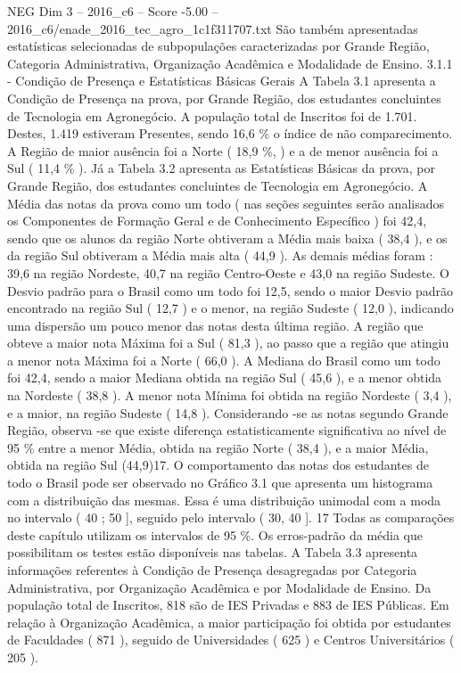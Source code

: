 \begin{textsample}{NEG Dim 3 – 2016\_c6 – Score -5.00 – 2016\_c6/enade\_2016\_tec\_agro\_1c1f311707.txt}
São também apresentadas estatísticas selecionadas de subpopulações caracterizadas por Grande Região, Categoria Administrativa, Organização Acadêmica e Modalidade de Ensino. 3.1.1 - Condição de Presença e Estatísticas Básicas Gerais A Tabela 3.1 apresenta a Condição de Presença na prova, por Grande Região, dos estudantes concluintes de Tecnologia em Agronegócio.
A população total de Inscritos foi de 1.701.
Destes, 1.419 estiveram Presentes, sendo 16,6 \% o índice de não comparecimento.
A Região de maior ausência foi a Norte ( 18,9 \%, ) e a de menor ausência foi a Sul ( 11,4 \% ).
Já a Tabela 3.2 apresenta as Estatísticas Básicas da prova, por Grande Região, dos estudantes concluintes de Tecnologia em Agronegócio.
A Média das notas da prova como um todo ( nas seções seguintes serão analisados os Componentes de Formação Geral e de Conhecimento Específico ) foi 42,4, sendo que os alunos da região Norte obtiveram a Média mais baixa ( 38,4 ), e os da região Sul obtiveram a Média mais alta ( 44,9 ).
As demais médias foram : 39,6 na região Nordeste, 40,7 na região Centro-Oeste e 43,0 na região Sudeste.
O Desvio padrão para o Brasil como um todo foi 12,5, sendo o maior Desvio padrão encontrado na região Sul ( 12,7 ) e o menor, na região Sudeste ( 12,0 ), indicando uma dispersão um pouco menor das notas desta última região.
A região que obteve a maior nota Máxima foi a Sul ( 81,3 ), ao passo que a região que atingiu a menor nota Máxima foi a Norte ( 66,0 ).
A Mediana do Brasil como um todo foi 42,4, sendo a maior Mediana obtida na região Sul ( 45,6 ), e a menor obtida na Nordeste ( 38,8 ).
A menor nota Mínima foi obtida na região Nordeste ( 3,4 ), e a maior, na região Sudeste ( 14,8 ).
Considerando -se as notas segundo Grande Região, observa -se que existe diferença estatisticamente significativa ao nível de 95 \% entre a menor Média, obtida na região Norte ( 38,4 ), e a maior Média, obtida na região Sul (44,9)17.
O comportamento das notas dos estudantes de todo o Brasil pode ser observado no Gráfico 3.1 que apresenta um histograma com a distribuição das mesmas.
Essa é uma distribuição unimodal com a moda no intervalo ( 40 ; 50 ], seguido pelo intervalo ( 30, 40 ]. 17 Todas as comparações deste capítulo utilizam os intervalos de 95 \%.
Os erros-padrão da média que possibilitam os testes estão disponíveis nas tabelas.
A Tabela 3.3 apresenta informações referentes à Condição de Presença desagregadas por Categoria Administrativa, por Organização Acadêmica e por Modalidade de Ensino.
Da população total de Inscritos, 818 são de IES Privadas e 883 de IES Públicas.
Em relação à Organização Acadêmica, a maior participação foi obtida por estudantes de Faculdades ( 871 ), seguido de Universidades ( 625 ) e Centros Universitários ( 205 ).

\end{textsample}
